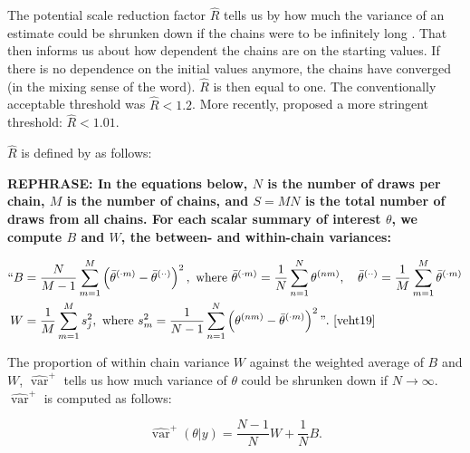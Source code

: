 \documentclass[article]{jss}
\begin{document}
The potential scale reduction factor $\widehat{R}$ tells us by how much the variance of an estimate could be shrunken down if the chains were to be infinitely long \cite{gelm92}. That then informs us about how dependent the chains are on the starting values. If there is no dependence on the initial values anymore, the chains have converged (in the mixing sense of the word). $\widehat{R}$ is then equal to one. The conventionally acceptable threshold was $\widehat{R} < 1.2$. More recently, \cite{veht19} proposed a more stringent threshold: $\widehat{R} < 1.01$. 

$\widehat{R}$ is defined by \cite{veht19} as follows: %

\textbf{REPHRASE: In the equations below, $N$ is the number of draws per chain, $M$ is the number of chains, and $S = MN$ is the total number of draws from all chains. For each scalar summary of interest $\theta$, we compute $B$ and $W$, the between- and within-chain variances:}

\begin{align*}
``B&=\frac{N}{M-1} \sum_{m=1}^{M}\left(\bar{\theta}^{(\cdot m)}-\bar{\theta}^{(\cdot \cdot)}\right)^{2}, \text { where } \bar{\theta}^{(\cdot m)}=\frac{1}{N} \sum_{n=1}^{N} \theta^{(n m)}, \quad \bar{\theta}^{(\cdot \cdot)}=\frac{1}{M} \sum_{m=1}^{M} \bar{\theta}^{(\cdot m)} \\
W&=\frac{1}{M} \sum_{m=1}^{M} s_{j}^{2},  \text { where } s_{m}^{2}=\frac{1}{N-1} \sum_{n=1}^{N}\left(\theta^{(n m)}-\bar{\theta}^{(\cdot m)}\right)^{2}". \text{ \cite[p.~5]{veht19}} 
\end{align*}


The proportion of within chain variance $W$ against the weighted average of $B$ and $W$, $\widehat{\operatorname{var}}^{+}$ tells us how much variance of $\theta$ could be shrunken down if $N\to\infty$. $\widehat{\operatorname{var}}^{+}$ is computed as follows: %

\begin{equation*}
\widehat{\operatorname{var}}^{+}(\theta | y)=\frac{N-1}{N} W+\frac{1}{N} B.
\end{equation*}
\end{document}
